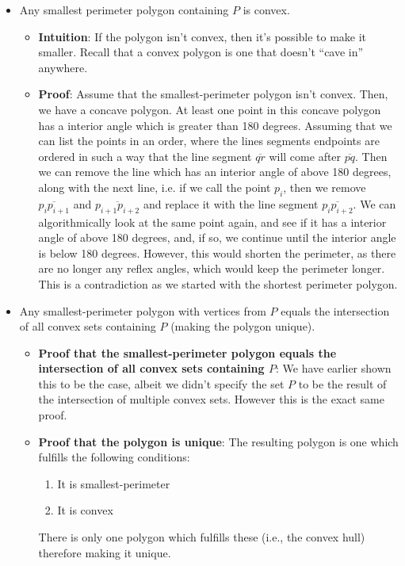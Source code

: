 \begin{itemize}
\begin{itemize}
	      \end{itemize}
	\item Any smallest perimeter polygon containing $P$ is convex.
	      \begin{itemize}
		      \item \textbf{Intuition}: If the polygon isn't convex, then it's possible to make it smaller. Recall that a convex polygon is one that doesn't ``cave in'' anywhere.

		      \item \textbf{Proof}:
								Assume that the smallest-perimeter polygon isn't convex. Then, we have a concave polygon. At least one point in this concave polygon has a interior angle which is greater than 180 degrees. Assuming that we can list the points in an order, where the lines segments endpoints are ordered in such a way that the line segment $\overline{qr}$ will come after $\overline{pq}$. Then we can remove the line which has an interior angle of above 180 degrees, along with the next line, i.e. if we call the point $p_{i}$, then we remove $\overline{p_{i}p_{i+1}}$ and $\overline{p_{i+1}p_{i+2}}$ and replace it with the line segment $\overline{p_{i}p_{i+2}}$. We can algorithmically look at the same point again, and see if it has a interior angle of above 180 degrees, and, if so, we continue until the interior angle is below 180 degrees. However, this would shorten the perimeter, as there are no longer any reflex angles, which would keep the perimeter longer. This is a contradiction as we started with the shortest perimeter polygon.
	      \end{itemize}
	\item Any smallest-perimeter polygon with vertices from $P$ equals the intersection of all convex sets containing $P$ (making the polygon unique).
	      \begin{itemize}
					\item \textbf{Proof that the smallest-perimeter polygon equals the intersection of all convex sets containing $P$}: We have earlier shown this to be the case, albeit we didn't specify the set $P$ to be the result of the intersection of multiple convex sets. However this is the exact same proof.
					\item \textbf{Proof that the polygon is unique}: The resulting polygon is one which fulfills the following conditions:
							\begin{enumerate}
								\item It is smallest-perimeter
								\item It is convex
							\end{enumerate}
							There is only one polygon which fulfills these (i.e., the convex hull) therefore making it unique.
	      \end{itemize}
\end{itemize}

